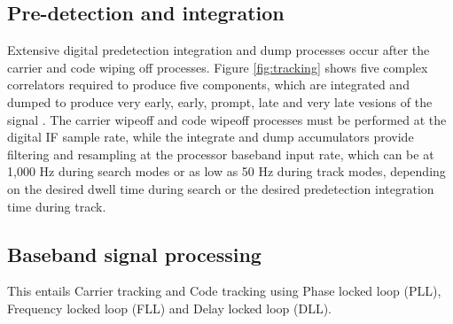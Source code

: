 \subsection{Pre-detection and integration}
Extensive digital predetection integration and dump processes occur after the carrier and code wiping off processes. Figure \ref{fig:tracking} shows five complex correlators required to produce five
components, which are integrated and dumped to produce very early, early, prompt, late and very late vesions of the signal . The carrier wipeoff and code wipeoff processes must be performed at the digital IF sample rate, while the integrate and dump accumulators provide filtering and resampling at the processor baseband input rate, which can be at 1,000 Hz during search modes or as low as 50 Hz during
track modes, depending on the desired dwell time during search or the desired predetection integration time during track.
\subsection{Baseband signal processing}
This entails Carrier tracking and Code tracking using Phase locked loop (PLL), Frequency locked loop (FLL) and Delay locked loop (DLL). 


